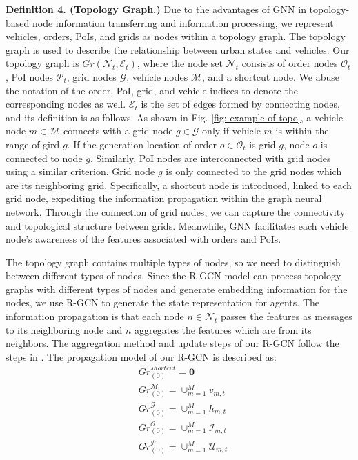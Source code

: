 \noindent\textbf{Definition 4. (Topology Graph.)} Due to the advantages of GNN in topology-based node information transferring and information processing, we represent vehicles, orders, PoIs, and grids as nodes within a topology graph. The topology graph is used to describe the relationship between urban states and vehicles. Our topology graph is $Gr(\mathcal{N}_t,\mathcal{E}_t)$, where the node set $\mathcal{N}_t$ consists of order nodes $\mathcal{O}_t$, PoI nodes $\mathcal{P}_t$, grid nodes $\mathcal{G}$, vehicle nodes $\mathcal{M}$, and a shortcut node. We abuse the notation of the order, PoI, grid, and vehicle indices to denote the corresponding nodes as well. $\mathcal{E}_t$ is the set of edges formed by connecting nodes, and its definition is as follows. As shown in Fig. \ref{fig: example of topo}, a vehicle node $m \in \mathcal{M}$ connects with a grid node $g \in \mathcal{G}$ only if vehicle $m$ is within the range of gird $g$. If the generation location of order $o \in \mathcal{O}_t$ is grid $g$, node $o$ is connected to node $g$. Similarly, PoI nodes are interconnected with grid nodes using a similar criterion. Grid node $g$ is only connected to the grid nodes which are its neighboring grid. Specifically, a shortcut node is introduced, linked to each grid node, expediting the information propagation within the graph neural network. Through the connection of grid nodes, we can capture the connectivity and topological structure between grids. Meanwhile, GNN facilitates each vehicle node's awareness of the features associated with orders and PoIs.

The topology graph contains multiple types of nodes, so we need to distinguish between different types of nodes. Since the R-GCN model can process topology graphs with different types of nodes and generate embedding information for the nodes, we use R-GCN to generate the state representation for agents. 
The information propagation is that each node $n \in \mathcal{N}_t$ passes the features as messages to its neighboring node and $n$ aggregates the features which are from its neighbors. The aggregation method and update steps of our R-GCN follow the steps in \cite{R-GCN}. The propagation model of our R-GCN is described as:
\begin{align}
    & {Gr}_{(0)}^{shortcut} = \textbf{0} \\
    & {Gr}_{(0)}^{\mathcal{M}} = \cup_{m = 1}^M v_{m,t}  \\
    & {Gr}_{(0)}^{\mathcal{G}} = \cup_{m = 1}^M h_{m,t}  \\
    & {Gr}_{(0)}^{\mathcal{O}} = \cup_{m = 1}^M \mathcal{I}_{m,t} \\
    & {Gr}_{(0)}^{\mathcal{P}} = \cup_{m = 1}^M \mathcal{U}_{m,t} 
\end{align}

